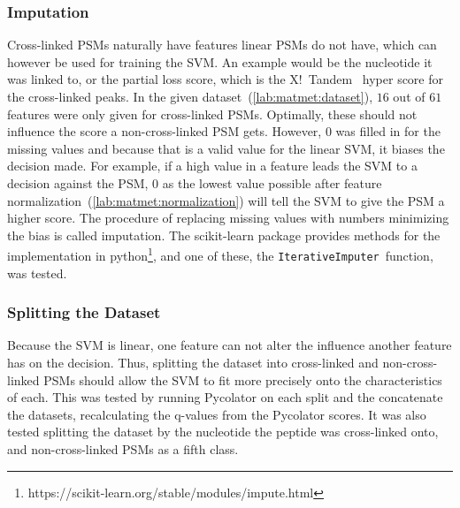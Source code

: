 \subsubsection{Imputation}
\label{lab:matmet:imputation}
Cross-linked PSMs naturally have features linear PSMs do not have, which can however be used for training the SVM. An example would be the nucleotide it was linked to, or the partial loss score, which is the X!~Tandem~\cite{Craig2004} hyper score for the cross-linked peaks. In the given dataset~(\ref{lab:matmet:dataset}), $16$ out of $61$ features were only given for cross-linked PSMs. Optimally, these should not influence the score a non-cross-linked PSM gets. However, $0$ was filled in for the missing values and because that is a valid value for the linear SVM, it biases the decision made. For example, if a high value in a feature leads the SVM to a decision against the PSM, $0$ as the lowest value possible after feature normalization~(\ref{lab:matmet:normalization}) will tell the SVM to give the PSM a higher score. The procedure of replacing missing values with numbers minimizing the bias is called imputation. The scikit-learn package provides methods for the implementation in python\footnote{https://scikit-learn.org/stable/modules/impute.html}, and one of these, the \texttt{IterativeImputer}~function, was tested. %
\subsubsection{Splitting the Dataset}
\label{lab:matmet:splitting}
Because the SVM is linear, one feature can not alter the influence another feature has on the decision. Thus, splitting the dataset into cross-linked and non-cross-linked PSMs should allow the SVM to fit more precisely onto the characteristics of each. This was tested by running Pycolator on each split and the concatenate the datasets, recalculating the q-values from the Pycolator scores. It was also tested splitting the dataset by the nucleotide the peptide was cross-linked onto, and non-cross-linked PSMs as a fifth class.
